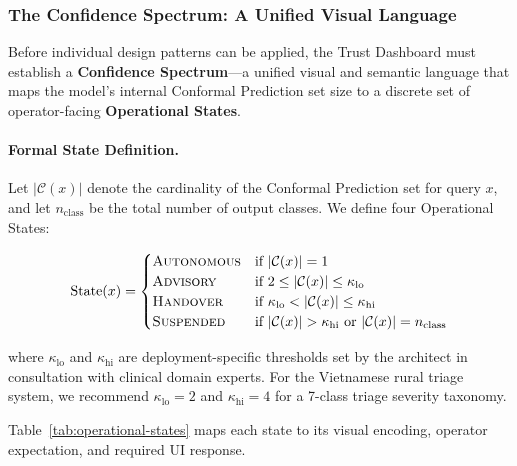 \subsubsection{The Confidence Spectrum: A Unified Visual Language}
\label{sec:sociotechnical-oversight}

Before individual design patterns can be applied, the Trust
Dashboard must establish a \textbf{Confidence Spectrum}---a
unified visual and semantic language that maps the model's
internal Conformal Prediction set size to a discrete set of
operator-facing \textbf{Operational States}.

\paragraph{Formal State Definition.}
Let $|\mathcal{C}(x)|$ denote the cardinality of the Conformal
Prediction set for query $x$, and let $n_{\mathrm{class}}$ be
the total number of output classes.
We define four Operational States:

\begin{equation}
  \label{eq:operational-states}
  \mathrm{State}(x) =
  \begin{cases}
    \textsc{Autonomous}  & \text{if } |\mathcal{C}(x)| = 1 \\
    \textsc{Advisory}    & \text{if } 2 \leq |\mathcal{C}(x)|
                              \leq \kappa_{\mathrm{lo}} \\
    \textsc{Handover}    & \text{if } \kappa_{\mathrm{lo}} <
                              |\mathcal{C}(x)| \leq \kappa_{\mathrm{hi}} \\
    \textsc{Suspended}   & \text{if } |\mathcal{C}(x)| >
                              \kappa_{\mathrm{hi}} \text{ or }
                              |\mathcal{C}(x)| = n_{\mathrm{class}}
  \end{cases}
\end{equation}

where $\kappa_{\mathrm{lo}}$ and $\kappa_{\mathrm{hi}}$ are
deployment-specific thresholds set by the architect in
consultation with clinical domain experts.
For the Vietnamese rural triage system, we recommend
$\kappa_{\mathrm{lo}} = 2$ and $\kappa_{\mathrm{hi}} = 4$
for a 7-class triage severity taxonomy.

Table~\ref{tab:operational-states} maps each state to its
visual encoding, operator expectation, and required UI response.

